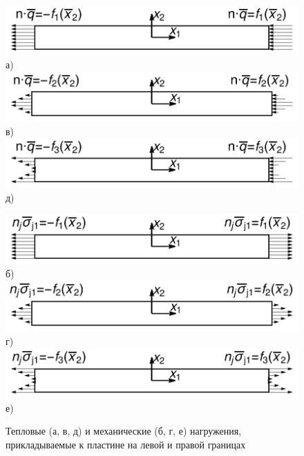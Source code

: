 \begin{figure}[ht]
    \begin{minipage}[b][][b]{0.49\linewidth}\centering
        \includegraphics[width=\linewidth]{pics/RectangleFluxF1.pdf} \\ а)
        \includegraphics[width=\linewidth]{pics/RectangleFluxF2.pdf} \\ в)
        \includegraphics[width=\linewidth]{pics/RectangleFluxF3.pdf} \\ д)
    \end{minipage}
    \hfill
    \begin{minipage}[b][][b]{0.49\linewidth}\centering
        \includegraphics[width=\linewidth]{pics/RectangleStressF1.pdf} \\ б)
        \includegraphics[width=\linewidth]{pics/RectangleStressF2.pdf} \\ г)
        \includegraphics[width=\linewidth]{pics/RectangleStressF3.pdf} \\ е)
    \end{minipage}
    \caption{Тепловые (а, в, д) и механические (б, г, е) нагружения, прикладываемые к пластине на левой и правой границах}
    \label{fig:SaintVenantLoads}
\end{figure}

